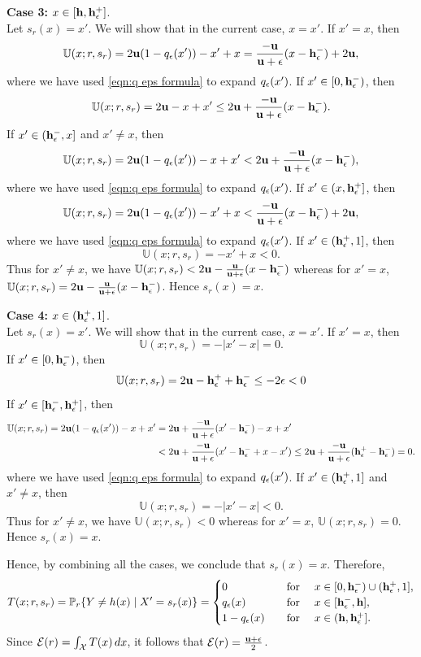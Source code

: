 \noindent \textbf{Case 3:} $ x \in [\mathbf{h}, \mathbf{h}_{\epsilon}^+] $.\\
   Let $s_r(x) = x'$. We will show that in the current case, $x=x'$. If $x'=x$, then 
\[\mathbb{U}(x;r,s_r) = 2\mathbf{u}(1-q_{\epsilon}(x')) - x' + x = \frac{-\mathbf{u}}{\mathbf{u}+\epsilon}(x-\mathbf{h}_{\epsilon}^-) + 2\mathbf{u},\] where we have used \eqref{eqn:q eps formula} to expand $q_{\epsilon}(x')$.    
If $x' \in [0,\mathbf{h}_{\epsilon}^-)$, then 
\[\mathbb{U}(x;r,s_r) = 2\mathbf{u} - x + x' \leq 2\mathbf{u} + \frac{-\mathbf{u}}{\mathbf{u} + \epsilon}(x-\mathbf{h}_{\epsilon}^-).\]
If $x' \in (\mathbf{h}_{\epsilon}^-,x]$ and $x' \neq x$, then
\[\mathbb{U}(x;r,s_r) = 2\mathbf{u}(1-q_{\epsilon}(x')) - x + x' < 2\mathbf{u} + \frac{-\mathbf{u}}{\mathbf{u}+\epsilon}(x-\mathbf{h}_{\epsilon}^-),\] where we have used \eqref{eqn:q eps formula} to expand $q_{\epsilon}(x')$.    
If $x' \in (x,\mathbf{h}_{\epsilon}^+]$, then
\[\mathbb{U}(x;r,s_r) = 2\mathbf{u}(1- q_{\epsilon}(x')) - x' + x < \frac{-\mathbf{u}}{\mathbf{u}+\epsilon}(x-\mathbf{h}_{\epsilon}^-) + 2\mathbf{u},\] where we have used \eqref{eqn:q eps formula} to expand $q_{\epsilon}(x')$. If $x' \in (\mathbf{h}_{\epsilon}^+,1]$, then 
\[\mathbb{U}(x;r,s_r) = -x' + x < 0.\] 
Thus for $x' \neq x$, we have $\mathbb{U}(x;r,s_r) < 2\mathbf{u} - \frac{\mathbf{u}}{\mathbf{u}+\epsilon}(x-\mathbf{h}_{\epsilon}^-)$ whereas for $x' = x$, $\mathbb{U}(x;r,s_r) = 2\mathbf{u} - \frac{\mathbf{u}}{\mathbf{u}+\epsilon}(x-\mathbf{h}_{\epsilon}^-)$. Hence $s_r(x) = x$. 

\noindent \textbf{Case 4:} $ x \in (\mathbf{h}_{\epsilon}^+, 1] $.\\
     Let $s_r(x) = x'$. We will show that in the current case, $x=x'$. If $x'=x$, then 
\[\mathbb{U}(x;r,s_r) = -|x'-x| = 0.\]    
If $x' \in [0,\mathbf{h}_{\epsilon}^-)$, then 
\[\mathbb{U}(x;r,s_r) = 2\mathbf{u} - \mathbf{h}_{\epsilon}^+ +\mathbf{h}_{\epsilon}^- \leq -2\epsilon < 0\]
If $x' \in [\mathbf{h}_{\epsilon}^-,\mathbf{h}_{\epsilon}^+]$, then
\begin{equation*}
    \begin{aligned}
        \mathbb{U}(x;r,s_r) = 2\mathbf{u}(1-q_{\epsilon}(x')) - x + x' &= 2\mathbf{u} + \frac{-\mathbf{u}}{\mathbf{u}+\epsilon}(x' - \mathbf{h}_{\epsilon}^-) - x + x' \\
        &< 2\mathbf{u} + \frac{-\mathbf{u}}{\mathbf{u} +\epsilon}(x'-\mathbf{h}_{\epsilon}^- + x - x')  \leq 2\mathbf{u} + \frac{-\mathbf{u}}{\mathbf{u} + \epsilon}(\mathbf{h}_{\epsilon}^+-\mathbf{h}_{\epsilon}^-) =0.
    \end{aligned}
\end{equation*}
 where we have used \eqref{eqn:q eps formula} to expand $q_{\epsilon}(x')$.    
If $x' \in (\mathbf{h}_{\epsilon}^+,1]$ and $x' \neq x$, then 
\[\mathbb{U}(x;r,s_r) = -|x'-x| <  0.\] 
Thus for $x' \neq x$, we have $\mathbb{U}(x;r,s_r) < 0$ whereas for $x' = x$, $\mathbb{U}(x;r,s_r) = 0$.  Hence $s_r(x) = x$. 

Hence, by combining all the cases, we conclude that $ s_r(x) = x $. Therefore,
    \[
    T(x; r, s_r) = \mathbb{P}_{r}\{Y \neq h(x) \mid X' = s_r(x)\} = \begin{cases}
        0 & \hbox{\quad for \quad} x \in [0, \mathbf{h}_{\epsilon}^-) \cup (\mathbf{h}_{\epsilon}^+, 1], \\
        q_{\epsilon}(x) & \hbox{\quad for \quad} x \in [\mathbf{h}_{\epsilon}^-, \mathbf{h}], \\
        1 - q_{\epsilon}(x) & \hbox{\quad for \quad} x \in (\mathbf{h}, \mathbf{h}_{\epsilon}^+].
    \end{cases}
    \]
    Since $ \mathcal{E}(r) = \int_{\mathcal{X}} T(x) \, dx $, it follows that $ \mathcal{E}(r) = \frac{\mathbf{u} + \epsilon}{2} $.